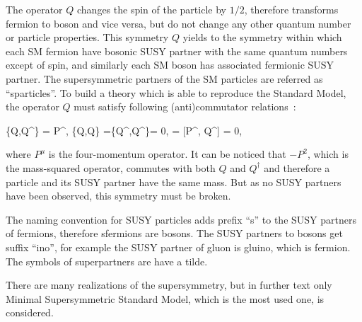 The operator $Q$ changes the spin of the particle by $1/2$, therefore transforms fermion to boson and vice versa, but do not change any other quantum number or particle properties. This symmetry $Q$ yields to the symmetry within which each SM fermion have bosonic SUSY partner with the same quantum numbers except of spin, and similarly each SM boson has associated fermionic SUSY partner. The supersymmetric partners of the SM particles are referred as ``sparticles''. To build a theory which is able to reproduce the Standard Model, the operator $Q$ must satisfy following (anti)commutator relations~\cite{Haag:1974qh, Coleman:1967ad}:

{
\{Q,Q^{\dagger}\} = P^{\mu}, \; \{Q,Q\} =\{Q^{\dagger},Q^{\dagger}\}= 0, \; [P^{\mu}, Q] = [P^{\mu}, Q^{\dagger}] = 0,
}

where $P^{\mu}$ is the four-momentum operator. It can be noticed that $-P^{2}$, which is the mass-squared operator, commutes with both $Q$ and $Q^{\dagger}$ and therefore a particle and its SUSY partner have the same mass. But as no SUSY partners have been observed, this symmetry must be broken. 

The naming convention for SUSY particles adds prefix ``s'' to the SUSY partners of fermions, therefore sfermions are bosons. The SUSY partners to bosons get suffix ``ino'', for example the SUSY partner of gluon is gluino, which is fermion. The symbols of superpartners are have a tilde.

There are many realizations of the supersymmetry, but in further text only Minimal Supersymmetric Standard Model, which is the most used one, is considered.


